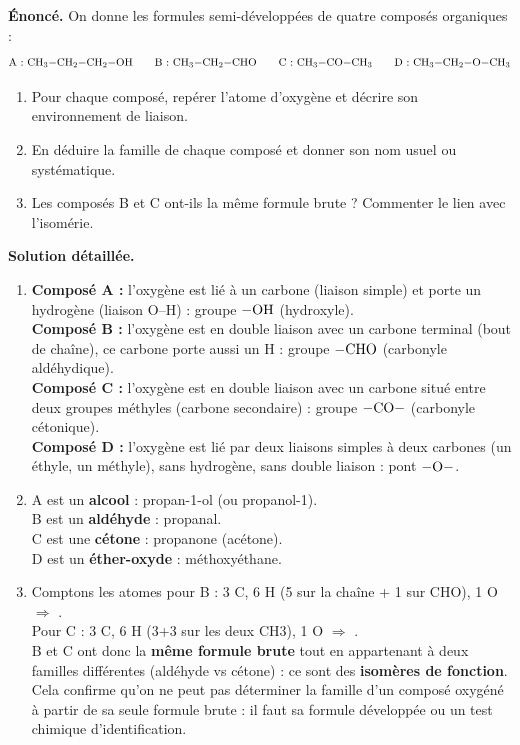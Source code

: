 \documentclass[11pt]{article}
\begin{document}
\begin{exoresolu}
\textbf{Énoncé.} On donne les formules semi-développées de quatre composés organiques :
\[
\text{A : } \ce{CH3-CH2-CH2-OH} \qquad
\text{B : } \ce{CH3-CH2-CHO} \qquad
\text{C : } \ce{CH3-CO-CH3} \qquad
\text{D : } \ce{CH3-CH2-O-CH3}
\]
\begin{enumerate}
\item Pour chaque composé, repérer l'atome d'oxygène et décrire son environnement de liaison.
\item En déduire la famille de chaque composé et donner son nom usuel ou systématique.
\item Les composés B et C ont-ils la même formule brute ? Commenter le lien avec l'isomérie.
\end{enumerate}
\tcblower
\textbf{Solution détaillée.}
\begin{enumerate}
\item \textbf{Composé A :} l'oxygène est lié à un carbone (liaison simple) et porte un hydrogène (liaison O--H) : groupe $-\ce{OH}$ (hydroxyle).\\
      \textbf{Composé B :} l'oxygène est en double liaison avec un carbone terminal (bout de chaîne), ce carbone porte aussi un H : groupe $-\ce{CHO}$ (carbonyle aldéhydique).\\
      \textbf{Composé C :} l'oxygène est en double liaison avec un carbone situé entre deux groupes méthyles (carbone secondaire) : groupe $-\ce{CO}-$ (carbonyle cétonique).\\
      \textbf{Composé D :} l'oxygène est lié par deux liaisons simples à deux carbones (un éthyle, un méthyle), sans hydrogène, sans double liaison : pont $-\ce{O}-$.
\item A est un \textbf{alcool} : propan-1-ol (ou propanol-1).\\
      B est un \textbf{aldéhyde} : propanal.\\
      C est une \textbf{cétone} : propanone (acétone).\\
      D est un \textbf{éther-oxyde} : méthoxyéthane.
\item Comptons les atomes pour B : 3 C, 6 H (5 sur la chaîne + 1 sur CHO), 1 O $\Rightarrow$ .\\
      Pour C : 3 C, 6 H (3+3 sur les deux CH3), 1 O $\Rightarrow$ .\\
      B et C ont donc la \textbf{même formule brute}  tout en appartenant à deux familles différentes (aldéhyde vs cétone) : ce sont des \textbf{isomères de fonction}. Cela confirme qu'on ne peut pas déterminer la famille d'un composé oxygéné à partir de sa seule formule brute : il faut sa formule développée ou un test chimique d'identification.
\end{enumerate}
\end{exoresolu}
\end{document}
